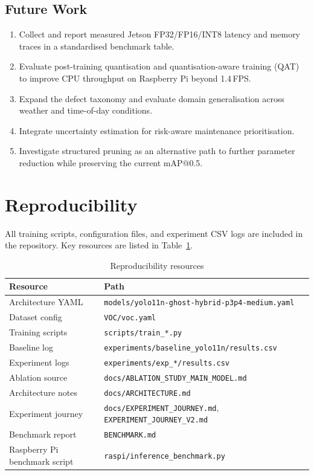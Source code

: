\documentclass[11pt,a4paper]{article}
\begin{document}
\subsection*{Future Work}

\begin{enumerate}[leftmargin=2em]
  \item Collect and report measured Jetson FP32/FP16/INT8 latency and memory traces
    in a standardised benchmark table.
  \item Evaluate post-training quantisation and quantisation-aware training (QAT) to
    improve CPU throughput on Raspberry Pi beyond 1.4\,FPS.
  \item Expand the defect taxonomy and evaluate domain generalisation across weather
    and time-of-day conditions.
  \item Integrate uncertainty estimation for risk-aware maintenance prioritisation.
  \item Investigate structured pruning as an alternative path to further parameter
    reduction while preserving the current mAP@0.5.
\end{enumerate}

\section*{Reproducibility}

All training scripts, configuration files, and experiment CSV logs are included in the
repository. Key resources are listed in Table~\ref{tab:repro}.

\begin{table}[H]
\centering
\caption{Reproducibility resources}
\label{tab:repro}
\begin{tabular}{ll}
\toprule
\textbf{Resource}              & \textbf{Path} \\
\midrule
Architecture YAML              & \texttt{models/yolo11n-ghost-hybrid-p3p4-medium.yaml} \\
Dataset config                 & \texttt{VOC/voc.yaml} \\
Training scripts               & \texttt{scripts/train\_*.py} \\
Baseline log                   & \texttt{experiments/baseline\_yolo11n/results.csv} \\
Experiment logs                & \texttt{experiments/exp\_*/results.csv} \\
Ablation source                & \texttt{docs/ABLATION\_STUDY\_MAIN\_MODEL.md} \\
Architecture notes             & \texttt{docs/ARCHITECTURE.md} \\
Experiment journey             & \texttt{docs/EXPERIMENT\_JOURNEY.md}, \texttt{EXPERIMENT\_JOURNEY\_V2.md} \\
Benchmark report               & \texttt{BENCHMARK.md} \\
Raspberry Pi benchmark script  & \texttt{raspi/inference\_benchmark.py} \\
\bottomrule
\end{tabular}
\end{table}
\end{document}
